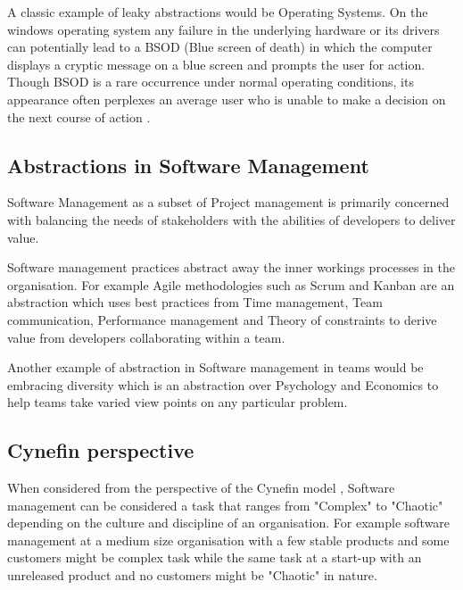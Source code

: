 \documentclass[12pt,conference]{IEEEtran}
\begin{document}
A classic example of leaky abstractions would be Operating Systems. On the windows operating system any failure in the underlying hardware or its drivers can potentially lead to a BSOD (Blue screen of death) in which the computer displays a cryptic message on a blue screen and prompts the user for action. Though BSOD is a rare occurrence under normal operating conditions, its appearance often perplexes an average user who is unable to make a decision on the next course of action \cite{rosenberg_law_2007}. 

\subsection*{Abstractions in Software Management}

Software Management as a subset of Project management is primarily concerned with balancing the needs of stakeholders with the abilities of developers to deliver value.

Software management practices abstract away the inner workings processes in the organisation. For example Agile methodologies such as Scrum and Kanban are an abstraction which uses best practices from Time management, Team communication, Performance management and Theory of constraints to derive value from developers collaborating within a team. 

Another example of abstraction in Software management in teams would be embracing diversity which is an abstraction over Psychology and Economics to help teams take varied view points on any particular problem. 

\subsection*{Cynefin perspective}

When considered from the perspective of the Cynefin model \cite{snowden_cynefin_????}, Software management can be considered a task that ranges from "Complex" to "Chaotic" depending on the culture and discipline of an organisation. For example software management at a medium size organisation with a few stable products and some customers might be complex task while the same task at a start-up with an unreleased product and no customers might be "Chaotic" in nature.
\end{document}
